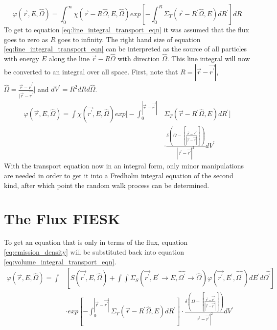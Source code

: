\vspace{0.5cm}
\begin{equation}
    \varphi(\vec{r},E,\hat{\Omega}) = 
    \int_0^{\infty} \chi(\vec{r} - R\hat{\Omega},E,\hat{\Omega})
    exp\left[-\int_0^R \Sigma_T(\vec{r}-R^{'}\hat{\Omega},E)dR^{'} \right] dR
  \label{eq:line_integral_transport_eqn}
\end{equation}
To get to equation \ref{eq:line_integral_transport_eqn} it was assumed that the
flux goes to zero as $R$ goes to infinity. The right hand size of equation 
\ref{eq:line_integral_transport_eqn} can be interpreted as the source of all
particles with energy $E$ along the line $\vec{r}-R\hat{\Omega}$ with direction
$\hat{\Omega}$. This line integral will now be converted to an integral over 
all space. First, note that $R = |\vec{r} - \vec{r^{'}}|$,
$\hat{\Omega} = \frac{\vec{r} - \vec{r^{'}}}{|\vec{r} - \vec{r^{'}}}|$ and
$dV^{'} = R^2dRd\hat{\Omega}$.
\begin{equation}
  \begin{split}
    \varphi(\vec{r},E,\hat{\Omega}) = 
    \int \chi(\vec{r^{'}},E,\hat{\Omega})
    exp\Big[-\int_0^{|\vec{r} - \vec{r^{'}}|} 
      &\Sigma_T(\vec{r}-R^{'}\hat{\Omega},E)dR^{'} \Big] \\
    &\cdot \frac{\delta \left(\Omega - \left[\frac{\vec{r} - \vec{r^{'}}}
        {|\vec{r} - \vec{r^{'}}|}\right]\right)}
    {|\vec{r} - \vec{r^{'}}|^2} dV^{'}
  \end{split}
  \label{eq:volume_integral_transport_eqn}
\end{equation}
With the transport equation now in an integral form, only minor manipulations
are needed in order to get it into a Fredholm integral equation of the second
kind, after which point the random walk process can be determined.

\section{The Flux FIESK}
To get an equation that is only in terms of the flux, equation 
\ref{eq:emission_density} will be substituted back into equation 
\ref{eq:volume_integral_transport_eqn}.
\begin{equation*}
  \begin{split}
    \varphi(\vec{r},E,\hat{\Omega}) = \int &\left[
    S(\vec{r^{'}},E,\hat{\Omega}) + 
    \int\int \Sigma_S(\vec{r^{'}},E^{'} \to E, \hat{\Omega^{'}} \to \hat{\Omega})
    \varphi(\vec{r^{'}},E^{'},\hat{\Omega^{'}})dE^{'}d\hat{\Omega^{'}} \right] \\
    & \cdot exp\left[-\int_0^{|\vec{r} - \vec{r^{'}}|} 
      \Sigma_T(\vec{r}-R^{'}\hat{\Omega},E)dR^{'} \right]
    \cdot \frac{\delta \left(\Omega - \left[\frac{\vec{r} - \vec{r^{'}}}
        {|\vec{r} - \vec{r^{'}}|}\right]\right)} 
    {|\vec{r} - \vec{r^{'}}|^2} dV^{'}
  \end{split}
\end{equation*}

